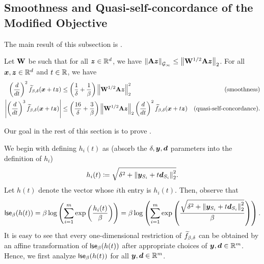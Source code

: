 \subsection{Smoothness and Quasi-self-concordance of the Modified Objective}
\label{sec:lse_calculus_special}

The main result of this subsection is .

\begin{lemma}
\label{lemma:obj_smooth_qsc}
Let $\mathbf{W}$ be such that for all $\bm{z} \in \mathbb{R}^d$, we have $\left\lVert \mathbf{A}\bm{z} \right\rVert_{\mathcal{G}_{\infty}} \le \left\lVert \mathbf{W}^{1/2}\mathbf{A}\bm{z} \right\rVert_2$. For all $\bm{x}, \bm{z} \in \mathbb{R}^d$ and $t\in\mathbb{R}$, we have
\begin{align*}
    \left(\frac{d}{dt}\right)^2 \widetilde{f}_{\beta,\delta}(\bm{x}+t\bm{z}) &\le \left(\frac{1}{\delta}+\frac{1}{\beta}\right)\left\lVert \mathbf{W}^{1/2}\mathbf{A}\bm{z} \right\rVert_2^2 & \text{(smoothness)} \\
    \left\lvert \left(\frac{d}{dt}\right)^3 \widetilde{f}_{\beta,\delta}(\bm{x}+t\bm{z}) \right\rvert &\le \left(\frac{16}{\delta}+\frac{3}{\beta}\right)\left\lVert \mathbf{W}^{1/2}\mathbf{A}\bm{z} \right\rVert_2\left(\frac{d}{dt}\right)^2 \widetilde{f}_{\beta,\delta}(\bm{x}+t\bm{z}) & \text{(quasi-self-concordance)}.
\end{align*}
\end{lemma}

Our goal in the rest of this section is to prove .

We begin with defining $h_i(t)$ as (absorb the $\delta,\bm{y},\bm{d}$ parameters into the definition of $h_i$)
\begin{align*}
    h_i(t) \coloneqq \sqrt{\delta^2+\left\lVert \bm{y}_{S_i}+t\bm{d}_{S_i} \right\rVert_2^2}.
\end{align*}
Let $h(t)$ denote the vector whose $i$th entry is $h_i(t)$. Then, observe that
\begin{align*}
    \mathsf{lse}_{\beta}(h(t)) = \beta\log\left(\sum_{i=1}^m \mathrm{exp}\left(\frac{h_i(t)}{\beta}\right)\right) = \beta\log\left(\sum_{i=1}^m \mathrm{exp}\left(\frac{\sqrt{\delta^2+\left\lVert \bm{y}_{S_i}+t\bm{d}_{S_i} \right\rVert_2^2}}{\beta}\right)\right).
\end{align*}
It is easy to see that every one-dimensional restriction of $\widetilde{f}_{\beta,\delta}$ can be obtained by an affine transformation of $\mathsf{lse}_{\beta}(h(t))$ after appropriate choices of $\bm{y},\bm{d}\in\mathbb{R}^m$. Hence, we first analyze $\mathsf{lse}_{\beta}(h(t))$ for all $\bm{y},\bm{d}\in\mathbb{R}^m$. 

